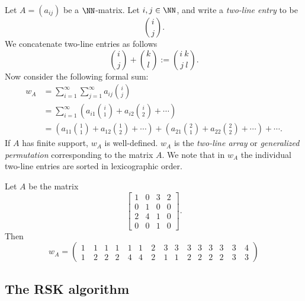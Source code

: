 \documentclass{article}
\begin{document}
\begin{definition}
    Let $A = (a_{ij})$ be a $\NN$-matrix. Let $i, j \in \NN$, and write a \textit{two-line entry} to be
    \[
        \binom{i}{j}.
    \]
    We concatenate two-line entries as follows
    \[
        \binom{i}{j} + \binom{k}{l} := \binom{i\:k}{j\:l}.
    \]
    Now consider the following formal sum:
    \begin{align*}
        w_A &= \sum_{i=1}^\infty \sum_{j=1}^\infty a_{ij}\binom{i}{j} \\
            &= \sum_{i=1}^\infty \left(a_{i1}\binom{i}{1} + a_{i2}\binom{i}{2} + \cdots\right) \\
            &= \left(a_{11}\binom{1}{1} + a_{12}\binom{1}{2} + \cdots\right) + \left(a_{21}\binom{2}{1} + a_{22}\binom{2}{2} + \cdots\right) + \cdots.
    \end{align*}
    If $A$ has finite support, $w_A$ is well-defined. 
    $w_A$ is the \textit{two-line array} or \textit{generalized permutation} corresponding to the matrix $A$. We note that in $w_A$ the individual two-line entries are sorted in lexicographic order.
\end{definition}

\begin{example}
    Let $A$ be the matrix
    \[
        \begin{bmatrix}
            1 & 0 & 3 & 2 \\
            0 & 1 & 0 & 0 \\
            2 & 4 & 1 & 0 \\
            0 & 0 & 1 & 0
        \end{bmatrix}.
    \]
    Then 
    \[
        w_A = \begin{pmatrix}
            1 & 1 & 1 & 1 & 1 & 1 \
              & 2 \
              & 3 & 3 & 3 & 3 & 3 & 3 & 3\
              & 4 \\
            1 \
              & 2 & 2 & 2 \
              & 4 & 4 \
              & 2 \
              & 1 & 1 \
              & 2 & 2 & 2 & 2 \
              & 3 \
              & 3
        \end{pmatrix}
    \]
\end{example}

\subsection{The RSK algorithm}
\end{document}
